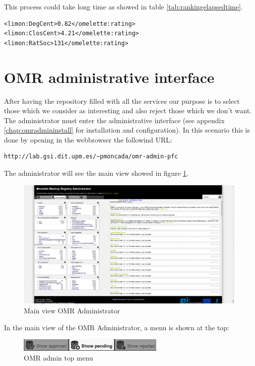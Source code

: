 This process could take long time as showed in table \ref{tab:rankingelapsedtime}.

\begin{lstlisting}[style=listXML, label={lst:rdfranking}, caption={Ranking algorithm output}]
<limon:DegCent>0.82</omelette:rating>
<limon:ClosCent>4.21</omelette:rating>
<limon:RatSoc>131</omelette:rating>
\end{lstlisting}

\newpage
\section{OMR administrative interface}

After having the repository filled with all the services our purpose is to select those which we consider as interesting and also reject those which we don't want.
The administrator must enter the administrative interface (see appendix \ref{chap:omradmininstall} for installation and configuration).
In this scenario this is done by opening in the webbrowser the followind URL:
\begin{lstlisting}[style=consola]
http://lab.gsi.dit.upm.es/~pmoncada/omr-admin-pfc
\end{lstlisting}

The administrator will see the main view showed in figure \ref{fig:omradminmainview}.

\begin{figure}[h]
	\centering
	\includegraphics[width=400pt]{graphics/omr-admin-main.png}
	\caption{Main view OMR Administrator}
	\label{fig:omradminmainview}
\end{figure}


In the main view of the OMR Administrator, a menu is shown at the top:

\begin{figure}[h]
	\centering
	\includegraphics[width=200pt]{graphics/admin-top-menu.png}
	\caption{OMR admin top menu}
	\label{fig:topmenuomr}
\end{figure}

